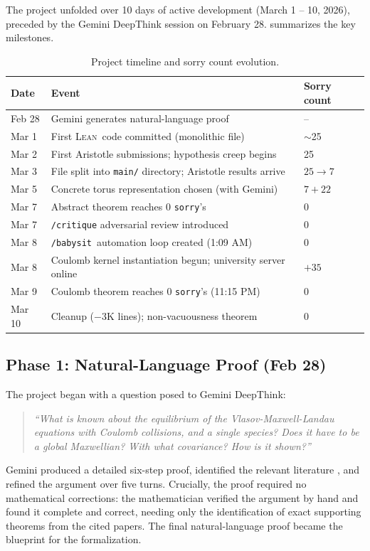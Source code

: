 \documentclass[11pt]{article}
\newcommand{\lean}{\textsc{Lean}}
\newcommand{\sorry}{\texttt{sorry}}
\newcommand{\babysit}{\texttt{/babysit}}
\begin{document}
The project unfolded over 10 days of active development (March 1 -- 10, 2026), preceded by the Gemini DeepThink session on February 28.  summarizes the key milestones.

\begin{table}[t]
\centering
\small
\begin{tabular}{@{}lll@{}}
\toprule
Date & Event & Sorry count \\
\midrule
Feb 28 & Gemini generates natural-language proof & -- \\
Mar 1 & First \lean\ code committed (monolithic file) & $\sim$25 \\
Mar 2 & First Aristotle submissions; hypothesis creep begins & 25 \\
Mar 3 & File split into \texttt{main/} directory; Aristotle results arrive & $25 \to 7$ \\
Mar 5 & Concrete torus representation chosen (with Gemini) & $7 + 22$ \\
Mar 7 & Abstract theorem reaches 0 \sorry's & 0 \\
Mar 7 & \texttt{/critique} adversarial review introduced & 0 \\
Mar 8 & \babysit\ automation loop created (1:09 AM) & 0 \\
Mar 8 & Coulomb kernel instantiation begun; university server online & $+35$ \\
Mar 9 & Coulomb theorem reaches 0 \sorry's (11:15 PM) & 0 \\
Mar 10 & Cleanup ($-3$K lines); non-vacuousness theorem & 0 \\
\bottomrule
\end{tabular}
\caption{Project timeline and sorry count evolution.}
\label{tab:timeline}
\end{table}

\subsection{Phase 1: Natural-Language Proof (Feb 28)}

The project began with a question posed to Gemini DeepThink:

\begin{quote}
\emph{``What is known about the equilibrium of the Vlasov-Maxwell-Landau equations with Coulomb collisions, and a single species? Does it have to be a global Maxwellian? With what covariance? How is it shown?''}
\end{quote}

Gemini produced a detailed six-step proof, identified the relevant literature \citep{villani2002,cercignani1994,guo2003,guo2012,desvillettes2005}, and refined the argument over five turns. Crucially, the proof required no mathematical corrections: the mathematician verified the argument by hand and found it complete and correct, needing only the identification of exact supporting theorems from the cited papers. The final natural-language proof became the blueprint for the formalization.
\end{document}
